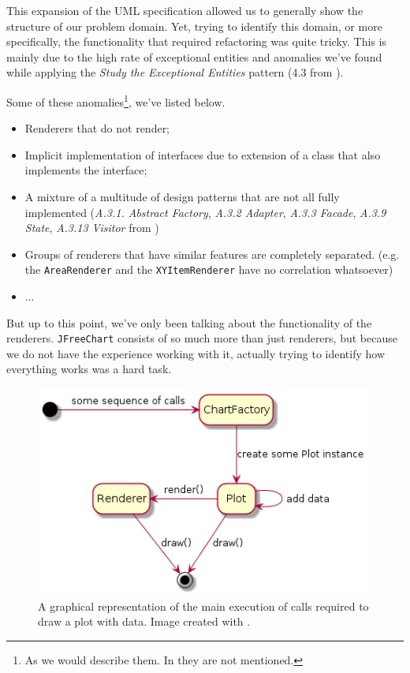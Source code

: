 \documentclass[11pt]{article}
\begin{document}
	This expansion of the UML specification allowed us to generally show the structure of our problem domain. Yet, trying to identify this domain, or more specifically, the functionality that required refactoring was quite tricky. This is mainly due to the high rate of exceptional entities and anomalies we've found while applying the \textsl{Study the Exceptional Entities} pattern (4.3 from \cite{demeyer2009object}).
	
	Some of these anomalies\footnote{As we would describe them. In \cite{demeyer2009object} they are not mentioned.}, we've listed below.
	\begin{itemize}
		\item Renderers that do not render;
		\item Implicit implementation of interfaces due to extension of a class that also implements the interface;
		\item A mixture of a multitude of design patterns that are not all fully implemented (\textsl{A.3.1. Abstract Factory}, \textsl{A.3.2 Adapter}, \textsl{A.3.3 Facade}, \textsl{A.3.9 State}, \textsl{A.3.13 Visitor} from \cite{demeyer2009object})
		\item Groups of renderers that have similar features are completely separated. (e.g. the \texttt{AreaRenderer} and the \texttt{XYItemRenderer} have no correlation whatsoever)
		\item ...
	\end{itemize}

	But up to this point, we've only been talking about the functionality of the renderers. \texttt{JFreeChart} consists of so much more than just renderers, but because we do not have the experience working with it, actually trying to identify how everything works was a hard task.
	
	\begin{figure}[H]
		\centering
		\includegraphics[scale=0.5]{pictures/draw-seq.png}
		\caption{A graphical representation of the main execution of calls required to draw a plot with data. Image created with \cite{plantuml}.}
		\label{fig:draw-seq}
	\end{figure}
\end{document}
